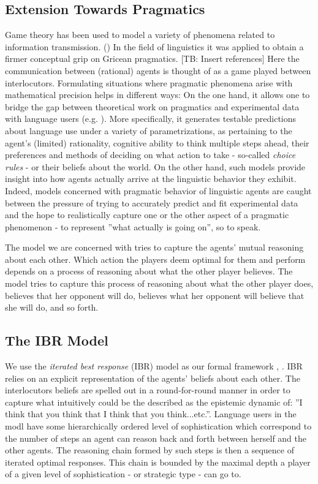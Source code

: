\documentclass[10pt]{article}
\newcommand{\sh}[1]{\textcolor[rgb]{.8,.33,.0}{[TB: #1]}}%
\begin{document}
\subsection{Extension Towards Pragmatics}
Game theory has been used to model a variety of phenomena related to information transmission. (\cite{spence1973job, smith1982evolution, cho1987signaling})
In the field of linguistics it was applied to obtain a firmer conceptual grip on Gricean pragmatics.
\sh{Insert references}
Here the communication between (rational) agents is thought of as a game played between interlocutors. Formulating situations where pragmatic phenomena arise with mathematical precision helps in different ways: On the one hand, it allows one to bridge the gap between theoretical work on pragmatics and experimental data with language users (e.g. \cite{frank2012predicting}). More specifically, it generates testable predictions about language use under a variety of parametrizations, as pertaining to the agent's (limited) rationality, cognitive ability to think multiple steps ahead, their preferences and methods of deciding on what action to take - so-called \textit{choice rules} \cite{galeazzi2017play}
 - or their beliefs about the world. On the other hand, such models provide insight into how agents actually arrive at the linguistic behavior they exhibit.
 Indeed, models concerned with pragmatic behavior of linguistic agents are caught between the pressure of trying to accurately predict and fit experimental data and the hope to realistically capture one or the other aspect of a pragmatic phenomenon - to represent ''what actually is going on'', so to speak.

The model we are concerned with tries to capture the agents' mutual reasoning about each other. Which action the players deem optimal for them and perform depends on a process of reasoning about what the other player believes. The model tries to capture this process of reasoning about what the other player does, believes that her opponent will do, believes what her opponent will believe that she will do, and so forth.
\subsection{The IBR Model}
We use the \textit{iterated best response} (IBR) model as our formal framework \cite{franke2009signal}, \cite{franke2014pragmatic}. IBR relies on an explicit representation of the agents' beliefs about each other. The interlocutors beliefs are spelled out in a round-for-round manner in order to capture what intuitively could be the described as the epistemic dynamic of: ''I think that you think that I think that you think...etc.''. Language users in the modl have some hierarchically ordered level of sophistication which correspond to the number of steps an agent can reason back and forth between herself and the other agents. The reasoning chain formed by such steps is then a sequence of iterated optimal responses. This chain is bounded by the maximal depth a player of a given level of sophistication - or strategic type - can go to.
\end{document}

